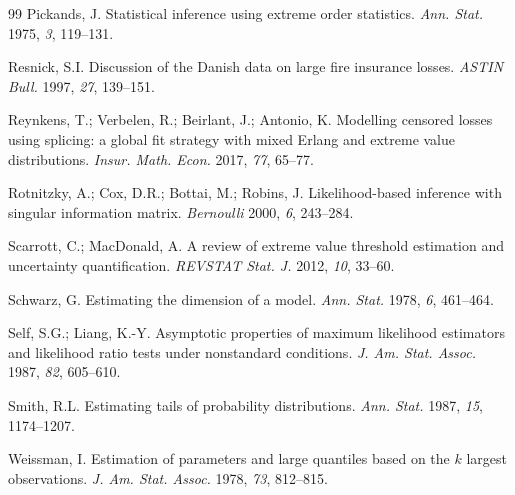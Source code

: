 \begin{thebibliography}{99}
 Pickands, J. Statistical inference using extreme order statistics. \textit{Ann. Stat.} 1975, \textit{3}, 119--131.

 Resnick, S.I. Discussion of the Danish data on large fire insurance losses. \textit{ASTIN Bull.} 1997, \textit{27}, 139--151.

 Reynkens, T.; Verbelen, R.; Beirlant, J.; Antonio, K. Modelling censored losses using splicing: a global fit strategy with mixed Erlang and extreme value distributions. \textit{Insur. Math. Econ.} 2017, \textit{77}, 65--77.

 Rotnitzky, A.; Cox, D.R.; Bottai, M.; Robins, J. Likelihood-based inference with singular information matrix. \textit{Bernoulli} 2000, \textit{6}, 243--284.

 Scarrott, C.; MacDonald, A. A review of extreme value threshold estimation and uncertainty quantification. \textit{REVSTAT Stat. J.} 2012, \textit{10}, 33--60.

 Schwarz, G. Estimating the dimension of a model. \textit{Ann. Stat.} 1978, \textit{6}, 461--464.

 Self, S.G.; Liang, K.-Y. Asymptotic properties of maximum likelihood estimators and likelihood ratio tests under nonstandard conditions. \textit{J. Am. Stat. Assoc.} 1987, \textit{82}, 605--610.

 Smith, R.L. Estimating tails of probability distributions. \textit{Ann. Stat.} 1987, \textit{15}, 1174--1207.

 Weissman, I. Estimation of parameters and large quantiles based on the $k$ largest observations. \textit{J. Am. Stat. Assoc.} 1978, \textit{73}, 812--815.

\end{thebibliography}
